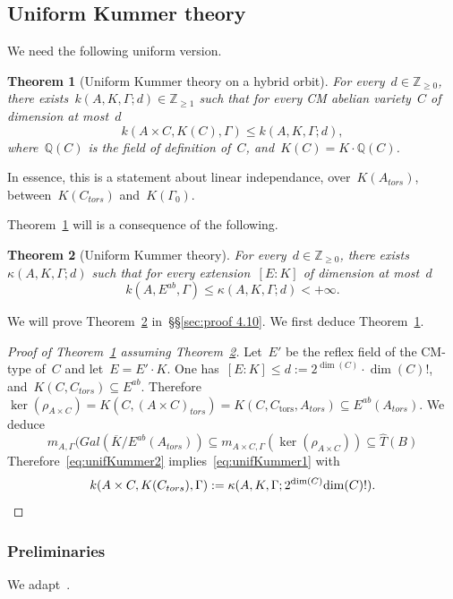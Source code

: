 \documentclass[12pt]{amsart}
\newtheorem{theorem}{Theorem}[section]
\newcommand{\tors}{{\text{tors}}}
\newcommand{\Z}{{\mathbb Z}}
\newcommand{\Q}{{\mathbb Q}}
\newcommand{\ol}{\overline}
\newcommand{\wh}{\widehat}
\begin{document}
\subsection{Uniform Kummer theory}

We need the following uniform version.
\begin{theorem}[Uniform Kummer theory on a hybrid orbit]\label{thm:uniform Kummer1}
For every~$d\in\Z_{\geq0}$, there exists~$k(A,K,\Gamma;d)\in\Z_{\geq1}$ such that for every CM abelian variety~$C$ of dimension at most~$d$ %
\begin{equation}\label{eq:unifKummer1}
k(A\times C,K(C),\Gamma)\leq k(A,K,\Gamma;d),
\end{equation}
where~$\Q(C)$ is the field of definition of~$C$, and~$K(C)=K\cdot \Q(C)$.
\end{theorem}
In essence, this is a statement about linear independance, over~$K(A_{tors})$, between~$K(C_{tors})$ and~$K(\Gamma_0)$.

Theorem~\ref{thm:uniform Kummer1} will is a consequence of the following.
\begin{theorem}[Uniform Kummer theory]\label{thm:uniform Kummer2}
For every~$d\in\Z_{\geq0}$, there exists~$\kappa(A,K,\Gamma;d)$ such that for every extension~$[E:K]$ of dimension at most~$d$
\begin{equation}\label{eq:unifKummer2}
k(A,E^{ab},\Gamma)\leq  \kappa(A,K,\Gamma;d)<+\infty.
\end{equation}
\end{theorem}
We will prove Theorem~\ref{thm:uniform Kummer2} in~\S\S\ref{sec:proof 4.10}. We first deduce Theorem~\ref{thm:uniform Kummer1}.

\begin{proof}[Proof of Theorem~\ref{thm:uniform Kummer1} assuming Theorem~\ref{thm:uniform Kummer2}]
Let~$E'$ be the reflex field of the CM-type of~$C$ and let~$E=E'\cdot K$. One has~$[E:K]\leq d:=2^{\dim(C)}\cdot \dim(C)!$, and~$K(C,C_{tors})\subseteq E^{ab}$.
Therefore~$\ker(\rho_{A\times C})=K(C,(A\times C)_{tors})=K(C,C_{\tors},A_{tors})
\subseteq E^{ab}(A_{tors})$. We deduce
\[
m_{A,\Gamma}(Gal(\ol{K}/E^{ab}(A_{tors}))
\subseteq 
m_{A\times C,\Gamma}(\ker(\rho_{A\times C}))
\subseteq 
\wh{T}(B)
\] Therefore~\eqref{eq:unifKummer2} implies~\eqref{eq:unifKummer1} with
\[k(A\times C,K(C_{tors}),\Gamma):= \kappa(A,K,\Gamma;2^{\dim(C)}{\dim(C)}!).\qedhere\]
\end{proof}


\subsubsection{Preliminaries} We adapt~\cite[App. 2]{Hindry}.
\end{document}
